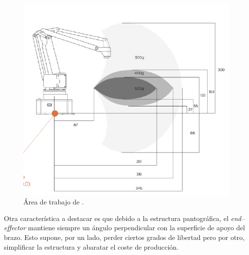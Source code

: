 \begin{figure}[H]
    \centering
    \includegraphics[width=.6\linewidth]{pictures/arm_weights_distances.png}
    \caption{Área de trabajo de \pArm{} \cite{UFACTORYXArmTextbackslashtextbaruArm}.}
    \label{fig:pArm_working_area}
\end{figure}

Otra característica a destacar es que debido a la estructura pantográfica, el \textit{end--effector} mantiene siempre un ángulo perpendicular con la superficie de apoyo del brazo. Esto supone, por un lado, perder ciertos grados de libertad pero por otro, simplificar la estructura y abaratar el coste de producción.